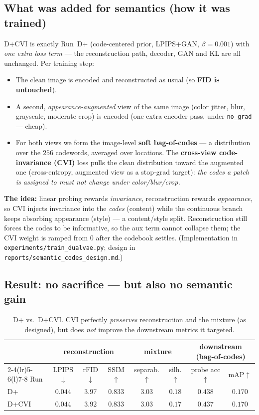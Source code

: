 \documentclass[11pt]{article}
\newcommand{\good}[1]{\textcolor{green!55!black}{#1}}
\newcommand{\bad}[1]{\textcolor{red!70!black}{#1}}
\begin{document}
\subsection*{What was added for semantics (how it was trained)}
D+CVI is exactly Run~D+ (code-centered prior, LPIPS+GAN, $\beta{=}0.001$) with \emph{one extra
loss term} --- the reconstruction path, decoder, GAN and KL are all unchanged. Per training step:
\begin{itemize}
  \item The clean image is encoded and reconstructed as usual (so \textbf{FID is untouched}).
  \item A second, \emph{appearance-augmented} view of the same image (color jitter, blur,
  grayscale, moderate crop) is encoded (one extra encoder pass, under \texttt{no\_grad} --- cheap).
  \item For both views we form the image-level \textbf{soft bag-of-codes} --- a distribution over
  the $256$ codewords, averaged over locations. The \textbf{cross-view code-invariance (CVI)} loss
  pulls the clean distribution toward the augmented one (cross-entropy, augmented view as a
  stop-grad target): \emph{the codes a patch is assigned to must not change under color/blur/crop.}
\end{itemize}
\textbf{The idea:} linear probing rewards \emph{invariance}, reconstruction rewards
\emph{appearance}, so CVI injects invariance into the \emph{codes} (content) while the continuous
branch keeps absorbing appearance (style) --- a content/style split. Reconstruction still forces
the codes to be informative, so the aux term cannot collapse them; the CVI weight is ramped from
$0$ after the codebook settles. (Implementation in \texttt{experiments/train\_dualvae.py}; design
in \texttt{reports/semantic\_codes\_design.md}.)

\subsection*{Result: no sacrifice --- but also no semantic gain}
\begin{table}[h]
\centering
\caption{D+ vs.\ D+CVI. CVI perfectly \emph{preserves} reconstruction and the mixture (as
designed), but does \emph{not} improve the downstream metrics it targeted.}
\label{tab:cvi}
\small
\begin{tabular}{lccc@{\hskip 1.5em}cc@{\hskip 1.5em}cc}
\toprule
 & \multicolumn{3}{c}{reconstruction} & \multicolumn{2}{c}{mixture} & \multicolumn{2}{c}{downstream (bag-of-codes)}\\
\cmidrule(r){2-4}\cmidrule(lr){5-6}\cmidrule(l){7-8}
Run & LPIPS$\downarrow$ & rFID$\downarrow$ & SSIM$\uparrow$ & separab.$\uparrow$ & silh.$\uparrow$ & probe acc$\uparrow$ & mAP$\uparrow$\\
\midrule
D+     & $0.044$ & $3.97$ & $0.833$ & $3.03$ & $0.18$ & $0.438$ & $0.170$\\
D+CVI  & \good{$0.044$} & \good{$3.92$} & \good{$0.833$} & \good{$3.03$} & \good{$0.17$} & \bad{$0.437$} & \bad{$0.170$}\\
\bottomrule
\end{tabular}
\end{table}
\end{document}
